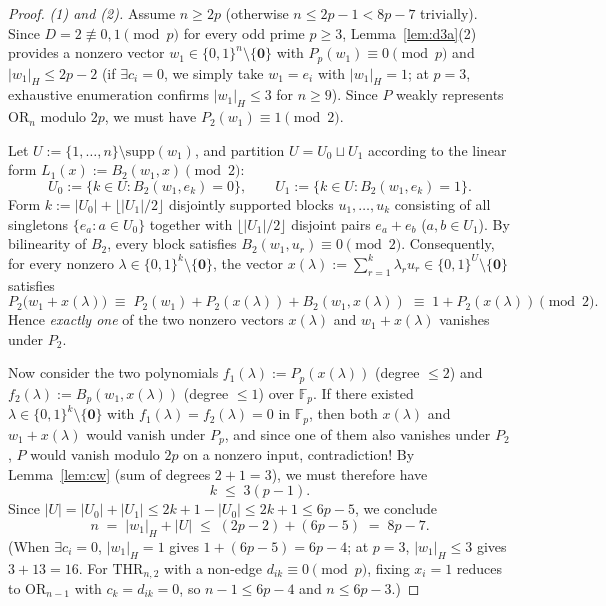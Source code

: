 \documentclass[11pt,a4paper]{article}
\theoremstyle{definition}
\newcommand{\F}{\mathbb{F}}
\newcommand{\OR}{\mathrm{OR}}
\newcommand{\THR}{\mathrm{THR}}
\newcommand{\supp}{\mathrm{supp}}
\begin{document}
\begin{proof}
\emph{(1) and (2).} Assume $n \ge 2p$ (otherwise $n \le 2p - 1 < 8p - 7$ trivially). Since $D = 2 \not\equiv 0, 1 \pmod p$ for every odd prime $p \ge 3$, Lemma~\ref{lem:d3a}(2) provides a nonzero vector $w_1 \in \{0,1\}^n \setminus \{\mathbf{0}\}$ with $P_p(w_1) \equiv 0 \pmod p$ and $|w_1|_H \le 2p - 2$ (if $\exists c_i = 0$, we simply take $w_1 = e_i$ with $|w_1|_H = 1$; at $p = 3$, exhaustive enumeration confirms $|w_1|_H \le 3$ for $n \ge 9$). Since $P$ weakly represents $\OR_n$ modulo $2p$, we must have $P_2(w_1) \equiv 1 \pmod 2$.

Let $U := \{1,\dots,n\} \setminus \supp(w_1)$, and partition $U = U_0 \sqcup U_1$ according to the linear form $L_1(x) := B_2(w_1, x) \pmod 2$:
\[
  U_0 := \{k \in U : B_2(w_1, e_k) = 0\},
  \qquad U_1 := \{k \in U : B_2(w_1, e_k) = 1\}.
\]
Form $k := |U_0| + \lfloor |U_1|/2 \rfloor$ disjointly supported blocks $u_1,\dots,u_k$ consisting of all singletons $\{e_a : a \in U_0\}$ together with $\lfloor |U_1|/2 \rfloor$ disjoint pairs $e_a + e_b$ ($a, b \in U_1$). By bilinearity of $B_2$, every block satisfies $B_2(w_1, u_r) \equiv 0 \pmod 2$. Consequently, for every nonzero $\lambda \in \{0,1\}^k \setminus \{\mathbf{0}\}$, the vector $x(\lambda) := \sum_{r=1}^k \lambda_r u_r \in \{0,1\}^U \setminus \{\mathbf{0}\}$ satisfies
\[
  P_2\bigl(w_1 + x(\lambda)\bigr) \;\equiv\; P_2(w_1) + P_2(x(\lambda)) + B_2(w_1, x(\lambda)) \;\equiv\; 1 + P_2(x(\lambda)) \pmod 2.
\]
Hence \emph{exactly one} of the two nonzero vectors $x(\lambda)$ and $w_1 + x(\lambda)$ vanishes under $P_2$.

Now consider the two polynomials $f_1(\lambda) := P_p(x(\lambda))$ (degree $\le 2$) and $f_2(\lambda) := B_p(w_1, x(\lambda))$ (degree $\le 1$) over $\F_p$. If there existed $\lambda \in \{0,1\}^k \setminus \{\mathbf{0}\}$ with $f_1(\lambda) = f_2(\lambda) = 0$ in $\F_p$, then both $x(\lambda)$ and $w_1 + x(\lambda)$ would vanish under $P_p$, and since one of them also vanishes under $P_2$, $P$ would vanish modulo $2p$ on a nonzero input, contradiction! By Lemma~\ref{lem:cw} (sum of degrees $2 + 1 = 3$), we must therefore have
\[
  k \;\le\; 3(p - 1).
\]
Since $|U| = |U_0| + |U_1| \le 2k + 1 - |U_0| \le 2k + 1 \le 6p - 5$, we conclude
\[
  n \;=\; |w_1|_H + |U| \;\le\; (2p - 2) + (6p - 5) \;=\; 8p - 7.
\]
(When $\exists c_i = 0$, $|w_1|_H = 1$ gives $1 + (6p - 5) = 6p - 4$; at $p = 3$, $|w_1|_H \le 3$ gives $3 + 13 = 16$. For $\THR_{n,2}$ with a non-edge $d_{ik} \equiv 0 \pmod p$, fixing $x_i = 1$ reduces to $\OR_{n-1}$ with $c_k = d_{ik} = 0$, so $n - 1 \le 6p - 4$ and $n \le 6p - 3$.)


\end{proof}
\end{document}
